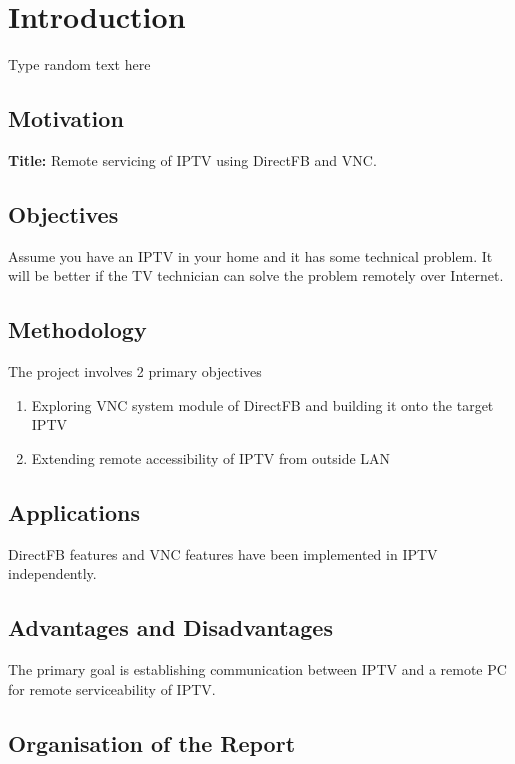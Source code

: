 \chapter{Introduction}
Type random text here
\section{Motivation}
\textbf{Title:} Remote servicing of IPTV using DirectFB and VNC.

\section{Objectives}
Assume you have an IPTV in your home and it has some technical problem. It will be better if the TV technician can solve the problem remotely over Internet. 

\section{Methodology}
The project involves 2 primary objectives
\begin{enumerate}
\item Exploring VNC system module of DirectFB and building it onto the target IPTV
\item Extending remote accessibility of IPTV from outside LAN
\end{enumerate}

\section{Applications}
DirectFB features and VNC features have been implemented in IPTV independently.

\section{Advantages and Disadvantages}
The primary goal is establishing communication between IPTV and a remote PC for remote serviceability of IPTV.

\section{Organisation of the Report}


